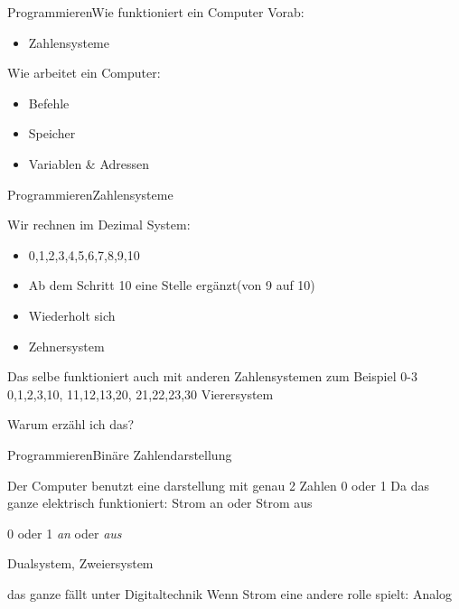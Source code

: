 

\begin{frame}{Programmieren}{Wie funktioniert ein Computer}
	Vorab:
	\begin{itemize}
	\item Zahlensysteme
	\end{itemize}	
	
	Wie arbeitet ein Computer:
	\begin{itemize}
	\item Befehle
	\item Speicher
	\item Variablen \& Adressen
	\end{itemize}
\end{frame}



\begin{frame}{Programmieren}{Zahlensysteme}

	Wir rechnen im Dezimal System:
	\begin{itemize}
	\item 0,1,2,3,4,5,6,7,8,9,10 
	\item Ab dem Schritt 10  eine Stelle ergänzt(von 9 auf 10) 
	\item Wiederholt sich
	\item Zehnersystem
	\end{itemize}
	
	
	Das selbe funktioniert auch mit anderen Zahlensystemen zum Beispiel 0-3 
	0,1,2,3,10,
	11,12,13,20,
	21,22,23,30
	Vierersystem
	
	Warum erzähl ich das?
	
\end{frame}

\begin{frame}{Programmieren}{Binäre Zahlendarstellung}

	Der Computer benutzt eine darstellung mit genau 2 Zahlen 0 oder 1 
	Da das ganze elektrisch funktioniert: Strom an oder Strom aus	
	
	0 oder 1
	\emph{an} oder \textit{aus}

	Dualsystem, Zweiersystem	
	
	das ganze fällt unter Digitaltechnik
	Wenn Strom eine andere rolle spielt: Analog
	
\end{frame}


